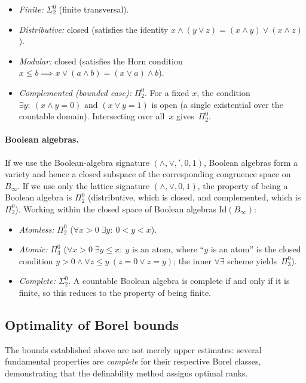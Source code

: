 \documentclass[12pt,fleqn,a4paper]{amsart}
\renewcommand{\le}{\leqslant}
\numberwithin{equation}{section}
\theoremstyle{definition}
\newcommand{\Id}{\mathrm{Id}}
\begin{document}
\begin{itemize}
\item \emph{Finite:} $\Sigma^0_2$ (finite transversal).
\item \emph{Distributive:} closed (satisfies the identity
$x\wedge(y\vee z)=(x\wedge y)\vee(x\wedge z)$).
\item \emph{Modular:} closed (satisfies the Horn condition
$x\le b\implies x\vee(a\wedge b)=(x\vee a)\wedge b$).
\item \emph{Complemented (bounded case):} $\Pi^0_2$.
For a fixed $x$, the condition $\exists y:\ (x\wedge y=0)\text{ and }(x\vee y=1)$
is open (a single existential over the countable domain).  Intersecting over all~$x$
gives~$\Pi^0_2$.
\end{itemize}

\paragraph{Boolean algebras.}
If we use the Boolean-algebra signature $(\wedge,\vee,{}',0,1)$, Boolean algebras form
a variety and hence a closed subspace of the corresponding congruence space on
$B_\infty$.  If we use only the lattice signature $(\wedge,\vee,0,1)$, the property of
being a Boolean algebra is $\Pi^0_2$ (distributive, which is closed, and complemented,
which is $\Pi^0_2$).  Working within the closed space of Boolean algebras $\Id(B_\infty)$:

\begin{itemize}
\item \emph{Atomless:} $\Pi^0_2$
($\forall x>0\;\exists y:\ 0<y<x$).
\item \emph{Atomic:} $\Pi^0_3$
($\forall x>0\;\exists y\le x:\ y\text{ is an atom}$, where ``$y$ is an atom'' is the
closed condition $y>0\wedge\forall z\le y\ (z=0\vee z=y)$; the inner $\forall\exists$
scheme yields~$\Pi^0_3$).
\item \emph{Complete:} $\Sigma^0_2$.  A countable Boolean algebra is complete if and only
if it is finite, so this reduces to the property of being finite.
\end{itemize}

\subsection{Optimality of Borel bounds}
\label{subsec:optimality}

The bounds established above are not merely upper estimates: several fundamental
properties are \emph{complete} for their respective Borel classes, demonstrating
that the definability method assigns optimal ranks.
\end{document}
